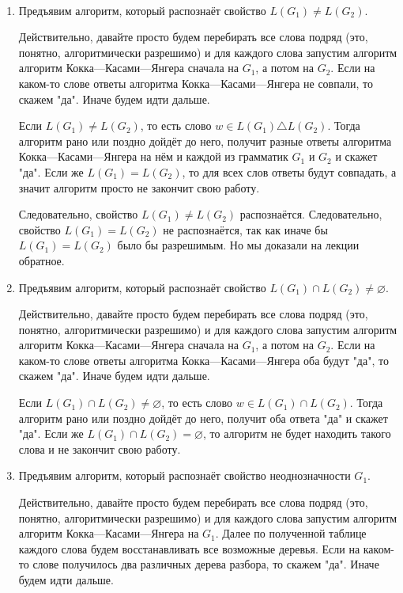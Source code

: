 \documentclass[12pt,a4paper]{article}
\begin{document}
    \begin{problem}{4}\ 
        \begin{enumerate}
            \renewcommand{\theenumi}{\alph{enumi}}
            \renewcommand{\labelenumi}{(\theenumi)}
            \item Предъявим алгоритм, который распознаёт свойство $L(G_1) \neq L(G_2)$.

                Действительно, давайте просто будем перебирать все слова подряд (это, понятно, алгоритмически разрешимо) и для каждого слова запустим алгоритм алгоритм Кокка---Касами---Янгера сначала на $G_1$, а потом на $G_2$. Если на каком-то слове ответы алгоритма Кокка---Касами---Янгера не совпали, то скажем "да". Иначе будем идти дальше.
                
                Если $L(G_1) \neq L(G_2)$, то есть слово $w \in L(G_1) \triangle L(G_2)$. Тогда алгоритм рано или поздно дойдёт до него, получит разные ответы алгоритма Кокка---Касами---Янгера на нём и каждой из грамматик $G_1$ и $G_2$ и скажет "да". Если же $L(G_1) = L(G_2)$, то для всех слов ответы будут совпадать, а значит алгоритм просто не закончит свою работу.

                Следовательно, свойство $L(G_1) \neq L(G_2)$ распознаётся. Следовательно, свойство $L(G_1) = L(G_2)$ не распознаётся, так как иначе бы $L(G_1) = L(G_2)$ было бы разрешимым. Но мы доказали на лекции обратное.
            
            \item Предъявим алгоритм, который распознаёт свойство $L(G_1) \cap L(G_2) \neq \varnothing$.

                Действительно, давайте просто будем перебирать все слова подряд (это, понятно, алгоритмически разрешимо) и для каждого слова запустим алгоритм алгоритм Кокка---Касами---Янгера сначала на $G_1$, а потом на $G_2$. Если на каком-то слове ответы алгоритма Кокка---Касами---Янгера оба будут "да", то скажем "да". Иначе будем идти дальше.

                Если $L(G_1) \cap L(G_2) \neq \varnothing$, то есть слово $w \in L(G_1) \cap L(G_2)$. Тогда алгоритм рано или поздно дойдёт до него, получит оба ответа "да" и скажет "да". Если же $L(G_1) \cap L(G_2) = \varnothing$, то алгоритм не будет находить такого слова и не закончит свою работу.

            \item Предъявим алгоритм, который распознаёт свойство неоднозначности $G_1$.

                Действительно, давайте просто будем перебирать все слова подряд (это, понятно, алгоритмически разрешимо) и для каждого слова запустим алгоритм алгоритм Кокка---Касами---Янгера на $G_1$. Далее по полученной таблице каждого слова будем восстанавливать все возможные деревья. Если на каком-то слове получилось два различных дерева разбора, то скажем "да". Иначе будем идти дальше.
                

\end{enumerate}
\end{problem}
\end{document}
